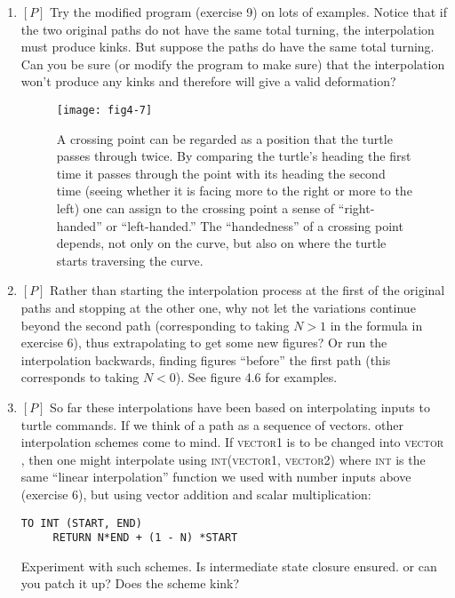 \documentclass{book}
\begin{document}
\begin{enumerate}
\item $[P]$ Try the modified program (exercise 9) on lots of examples. Notice
that if the two original paths do not have the same total turning, the
interpolation must produce kinks. But suppose the paths do have the
same total turning. Can you be sure (or modify the program to make
sure) that the interpolation won't produce any kinks and therefore will
give a valid deformation?

\begin{figure}
\begin{center}
\texttt{[image: fig4-7]}
\caption{A crossing point can be regarded as a position that the turtle passes through twice. By comparing the turtle's heading the first time it passes through the point with its heading the second time (seeing whether it is facing more to the right or more to the left) one can assign to the crossing point a sense of ``right-handed'' or ``left-handed.'' The ``handedness'' of a crossing point depends, not only on the curve, but also on where the turtle starts traversing the curve.}
\end{center}
\end{figure}

\item $[P]$ Rather than starting the interpolation process at the first of the
original paths and stopping at the other one, why not let the variations
continue beyond the second path (corresponding to taking $N > 1$ in the
formula in exercise 6), thus extrapolating to get some new figures? Or
run the interpolation backwards, finding figures ``before'' the first path
(this corresponds to taking $N < 0$). See figure 4.6 for examples.

\item $[P]$ So far these interpolations have been based on interpolating
inputs to turtle commands. If we think of a path as a sequence of vectors.
other interpolation schemes come to mind. If \textsc{vector1} is to be changed
into \textsc{vector} , then one might interpolate using \textsc{int(vector1, vector2)}
where \textsc{int} is the same ``linear interpolation'' function we used with
number inputs above (exercise 6), but using vector addition and scalar
multiplication:

\begin{verbatim}     
TO INT (START, END)
     RETURN N*END + (1 - N) *START
\end{verbatim}
Experiment with such schemes. Is intermediate state closure ensured.
or can you patch it up? Does the scheme kink?


\end{enumerate}
\end{document}
